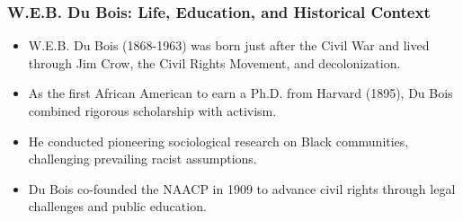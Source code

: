 \documentclass{beamer}
\begin{document}
	\begin{frame}
		\frametitle{W.E.B. Du Bois: Life, Education, and Historical Context}
		
		\begin{itemize}
			\item W.E.B. Du Bois (1868-1963) was born just after the Civil War and lived through Jim Crow, the Civil Rights Movement, and decolonization.
			\item As the first African American to earn a Ph.D. from Harvard (1895), Du Bois combined rigorous scholarship with activism.
			\item He conducted pioneering sociological research on Black communities, challenging prevailing racist assumptions.
			\item Du Bois co-founded the NAACP in 1909 to advance civil rights through legal challenges and public education.
		\end{itemize}
		
		\begin{center}
			\scriptsize
		\end{center}
		
	\end{frame}
	
\end{document}
